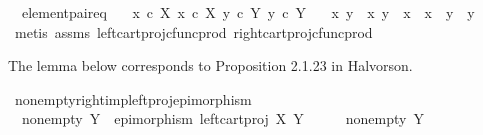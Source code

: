 \begin{isabellebody}
\begin{isamarkuptext}
\end{isamarkuptext}\isamarkuptrue%
\isamarkupfalse%
\ \ element{\isacharunderscore}{\kern0pt}pair{\isacharunderscore}{\kern0pt}eq{\isacharcolon}{\kern0pt}\isanewline
\ \ \ {\isachardoublequoteopen}x\ {\isasymin}\isactrlsub c\ X{\isachardoublequoteclose}\ {\isachardoublequoteopen}x{\isacharprime}{\kern0pt}\ {\isasymin}\isactrlsub c\ X{\isachardoublequoteclose}\ {\isachardoublequoteopen}y\ {\isasymin}\isactrlsub c\ Y{\isachardoublequoteclose}\ {\isachardoublequoteopen}y{\isacharprime}{\kern0pt}\ {\isasymin}\isactrlsub c\ Y{\isachardoublequoteclose}\isanewline
\ \ \ {\isachardoublequoteopen}{\isasymlangle}x{\isacharcomma}{\kern0pt}\ y{\isasymrangle}\ {\isacharequal}{\kern0pt}\ {\isasymlangle}x{\isacharprime}{\kern0pt}{\isacharcomma}{\kern0pt}\ y{\isacharprime}{\kern0pt}{\isasymrangle}\ {\isasymlongleftrightarrow}\ x\ {\isacharequal}{\kern0pt}\ x{\isacharprime}{\kern0pt}\ {\isasymand}\ y\ {\isacharequal}{\kern0pt}\ y{\isacharprime}{\kern0pt}{\isachardoublequoteclose}\isanewline
%
\isadelimproof
\ \ %
\endisadelimproof
%
\isatagproof
{}\isamarkupfalse%
\ {\isacharparenleft}{\kern0pt}metis\ assms\ left{\isacharunderscore}{\kern0pt}cart{\isacharunderscore}{\kern0pt}proj{\isacharunderscore}{\kern0pt}cfunc{\isacharunderscore}{\kern0pt}prod\ right{\isacharunderscore}{\kern0pt}cart{\isacharunderscore}{\kern0pt}proj{\isacharunderscore}{\kern0pt}cfunc{\isacharunderscore}{\kern0pt}prod{\isacharparenright}{\kern0pt}%
\endisatagproof
{\isafoldproof}%
%
\isadelimproof
%
\endisadelimproof
%
\begin{isamarkuptext}%
The lemma below corresponds to Proposition 2.1.23 in Halvorson.%
\end{isamarkuptext}\isamarkuptrue%
\isamarkupfalse%
\ nonempty{\isacharunderscore}{\kern0pt}right{\isacharunderscore}{\kern0pt}imp{\isacharunderscore}{\kern0pt}left{\isacharunderscore}{\kern0pt}proj{\isacharunderscore}{\kern0pt}epimorphism{\isacharcolon}{\kern0pt}\isanewline
\ \ {\isachardoublequoteopen}nonempty\ Y\ {\isasymLongrightarrow}\ epimorphism\ {\isacharparenleft}{\kern0pt}left{\isacharunderscore}{\kern0pt}cart{\isacharunderscore}{\kern0pt}proj\ X\ Y{\isacharparenright}{\kern0pt}{\isachardoublequoteclose}\isanewline
%
\isadelimproof
%
\endisadelimproof
%
\isatagproof
{}\isamarkupfalse%
\ {\isacharminus}{\kern0pt}\isanewline
\ \ \isamarkupfalse%
\ {\isachardoublequoteopen}nonempty\ Y{\isachardoublequoteclose}\isanewline
\ \ \isamarkupfalse%

\end{isabellebody}
